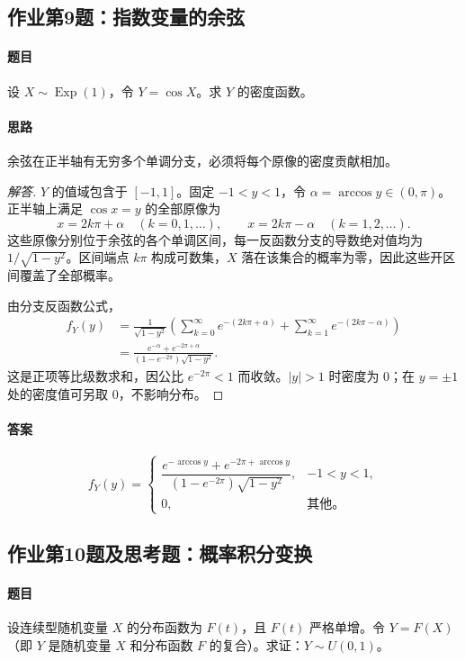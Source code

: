 \subsection{作业第9题：指数变量的余弦}\label{ex:w09-h9}
\paragraph{题目}
设 $X\sim\operatorname{Exp}(1)$，令 $Y=\cos X$。求 $Y$ 的密度函数。
\paragraph{思路} 余弦在正半轴有无穷多个单调分支，必须将每个原像的密度贡献相加。
\begin{proof}[解答]
$Y$ 的值域包含于 $[-1,1]$。固定 $-1<y<1$，令 $\alpha=\arccos y\in(0,\pi)$。正半轴上满足 $\cos x=y$ 的全部原像为
\[
x=2k\pi+\alpha\quad(k=0,1,\ldots),\qquad
x=2k\pi-\alpha\quad(k=1,2,\ldots).
\]
这些原像分别位于余弦的各个单调区间，每一反函数分支的导数绝对值均为 $1/\sqrt{1-y^2}$。区间端点 $k\pi$ 构成可数集，$X$ 落在该集合的概率为零，因此这些开区间覆盖了全部概率。

由分支反函数公式，
\begin{align*}
f_Y(y)
&=\frac1{\sqrt{1-y^2}}
\left(\sum_{k=0}^{\infty}e^{-(2k\pi+\alpha)}
+\sum_{k=1}^{\infty}e^{-(2k\pi-\alpha)}\right)\\
&=\frac{e^{-\alpha}+e^{-2\pi+\alpha}}
{(1-e^{-2\pi})\sqrt{1-y^2}}.
\end{align*}
这是正项等比级数求和，因公比 $e^{-2\pi}<1$ 而收敛。$|y|>1$ 时密度为 $0$；在 $y=\pm1$ 处的密度值可另取 $0$，不影响分布。
\end{proof}
\paragraph{答案}
\[
f_Y(y)=\begin{cases}
\dfrac{e^{-\arccos y}+e^{-2\pi+\arccos y}}
{(1-e^{-2\pi})\sqrt{1-y^2}},&-1<y<1,\\[6pt]
0,&\text{其他。}
\end{cases}
\]

\subsection{作业第10题及思考题：概率积分变换}\label{ex:w09-h10}
\paragraph{题目}
设连续型随机变量 $X$ 的分布函数为 $F(t)$，且 $F(t)$ 严格单增。令 $Y=F(X)$（即 $Y$ 是随机变量 $X$ 和分布函数 $F$ 的复合）。求证：$Y\sim U(0,1)$。

